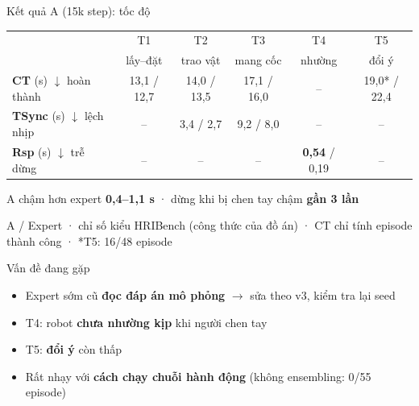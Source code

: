 \documentclass[aspectratio=169,11pt]{beamer}
\newcommand{\gray}[1]{{\color{mute}#1}}
\begin{document}
\begin{frame}{Kết quả A (15k step): tốc độ}
  \centering
  \vspace{0.6em}
  {\small
  \renewcommand{\arraystretch}{1.5}
  \begin{tabular}{@{}l c c c c c@{}}
    \toprule
    & T1 & T2 & T3 & T4 & T5 \\[-3pt]
    & \gray{\scriptsize lấy--đặt} & \gray{\scriptsize trao vật} & \gray{\scriptsize mang cốc}
    & \gray{\scriptsize nhường} & \gray{\scriptsize đổi ý} \\
    \midrule
    \textbf{CT} (s) $\downarrow$ \gray{\scriptsize hoàn thành} & 13,1 / 12,7 & 14,0 / 13,5 & 17,1 / 16,0 & -- & 19,0* / 22,4 \\
    \textbf{TSync} (s) $\downarrow$ \gray{\scriptsize lệch nhịp} & -- & 3,4 / 2,7 & 9,2 / 8,0 & -- & -- \\
    \textbf{Rsp} (s) $\downarrow$ \gray{\scriptsize trễ dừng} & -- & -- & -- & \textbf{0,54} / 0,19 & -- \\
    \bottomrule
  \end{tabular}}

  \vspace{1.2em}
  A chậm hơn expert \textbf{0,4--1,1 s} · dừng khi bị chen tay chậm \textbf{gần 3 lần}\par
  \vspace{0.8em}
  \gray{\scriptsize A / Expert · chỉ số kiểu HRIBench (công thức của đồ án) · CT chỉ tính episode thành công · *T5: 16/48 episode}
\end{frame}

\begin{frame}{Vấn đề đang gặp}
  \vspace{1em}
  \begin{itemize}\setlength{\itemsep}{1.1em}\large
    \item Expert sớm cũ \textbf{đọc đáp án mô phỏng} \gray{\small $\to$ sửa theo v3, kiểm tra lại seed}
    \item T4: robot \textbf{chưa nhường kịp} khi người chen tay
    \item T5: \textbf{đổi ý} còn thấp
    \item Rất nhạy với \textbf{cách chạy chuỗi hành động}
          \gray{\small(không ensembling: 0/55 episode)}
  \end{itemize}
\end{frame}
\end{document}
